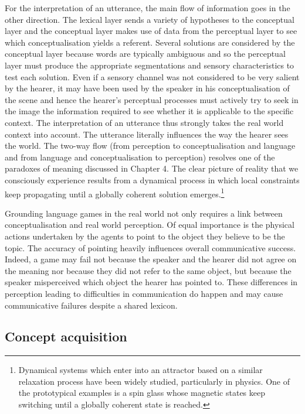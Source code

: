 For the interpretation of an utterance, the main 
flow of information goes in the other direction. The
lexical layer sends a variety of hypotheses to 
the conceptual layer and the conceptual layer makes use of data 
from the perceptual layer to see which conceptualisation
yields a referent. Several solutions are considered 
by the conceptual layer because words are typically 
ambiguous and so the perceptual 
layer must produce the appropriate segmentations and 
sensory characteristics to test each solution.
Even if a sensory channel was not considered to be 
very salient by the hearer, it may have been 
used by the speaker in his conceptualisation of the 
scene and hence the hearer's perceptual 
processes must actively try to seek in the 
image the information required to see whether it 
is applicable to the specific
context. The interpretation of an utterance
thus strongly takes the real world context into account. 
The utterance literally influences the way the 
hearer sees the world. The two-way flow (from perception
to conceptualisation and language and from language
and conceptualisation to perception) resolves one of the 
paradoxes of meaning discussed in Chapter 4. The 
clear picture of reality that we consciously experience
results from a dynamical process in which local constraints 
keep propagating until a globally coherent solution
emerges.\footnote{Dynamical systems which enter into an attractor
based on a similar relaxation process have been 
widely studied, particularly in physics. One of the 
prototypical examples is a spin glass whose magnetic
states keep switching until a globally coherent
state is reached.}

Grounding language games in the real world
not only requires a link between conceptualisation
and real world perception. Of equal importance is the physical
actions undertaken by the agents to point to the object they 
believe to be the topic. The accuracy of pointing
heavily influences overall communicative success. Indeed, a
game may fail not because
the speaker and the hearer did not agree on the meaning
nor because they did not refer to the same object, but because the 
speaker misperceived which object the hearer has pointed to. 
These differences in perception leading to difficulties
in communication do happen and may 
cause communicative failures despite a shared lexicon. 

\subsection{Concept acquisition}

